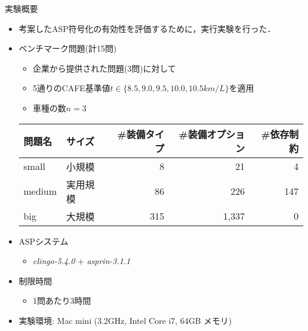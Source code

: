 \documentclass[dvipdfmx, 11pt]{beamer}
\begin{document}
\begin{frame}{実験概要}
 \begin{itemize}
  \item 考案したASP符号化の有効性を評価するために，実行実験を行った．
 \end{itemize}

\begin{itemize}
\item ベンチマーク問題(計15問)
  \begin{itemize}
  \item 企業から提供された問題(3問)に対して
  \item 5通りのCAFE基準値$t\in\{8.5, 9.0, 9.5, 10.0, 10.5km/L\}$を適用
  \item 車種の数$n = 3$
  \end{itemize}
  \begin{exampleblock}\small
    \centering
    \begin{tabular}{ ll|r r r }
      問題名 & サイズ &  \#装備タイプ & \#装備オプション& \#依存制約\\ \hline
      small	 & 小規模   &   8 &   21  &   4	\\
      medium & 実用規模 &  86 &  226  & 147	\\
      big    & 大規模   & 315 & 1,337 &   0
    \end{tabular}
  \end{exampleblock}
 \item ASPシステム
       \begin{itemize}
	\item \textit{clingo-5.4.0} + \textit{asprin-3.1.1}
       \end{itemize}
 \item 制限時間
       \begin{itemize}
	\item 1問あたり3時間
       \end{itemize}
 \item 実験環境: Mac mini (3.2GHz, Intel Core i7, 64GB メモリ)
\end{itemize}
\end{frame}
\end{document}
